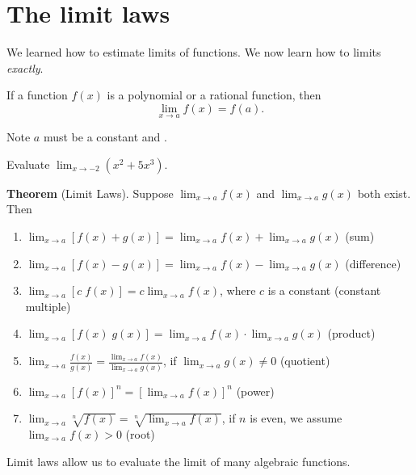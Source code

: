 \documentclass[../main.tex]{subfiles}
\begin{document}
 \section{The limit laws}
We learned how to estimate limits of functions. We now learn how to  limits \emph{exactly}.


\begin{mdframed}[style=simple-compact]
  If a function \(f(x)\) is a polynomial or a rational function, then
  \[
    \lim_{x \to a} f(x) = f(a).
  \]
\end{mdframed}
\faExclamationTriangle{} Note \(a\) must be a constant \underline{\hspace{6cm}} and \underline{\hspace{2in}}.


\begin{example}
  Evaluate \(\lim_{x \to -2} (x^{2} + 5 x^{3})\).

\end{example}

\begin{mdframed}[style=withref-compact]
  \textbf{Theorem} (Limit Laws). Suppose \(\lim_{x \to a} f(x)\) and \(\lim_{x \to a} g(x)\) {both exist}. Then
  \begin{enumerate}[label=(\arabic*)]
    \item \(\lim_{x \to a} [f(x) + g(x)] = \lim_{x \to a} f(x) + \lim_{x \to a} g(x)\) \hfill (sum)
    \item \(\lim_{x \to a} [f(x) - g(x)] = \lim_{x \to a} f(x) - \lim_{x \to a} g(x)\) \hfill (difference)
    \item \(\lim_{x \to a} [c \; f(x)] = c \lim_{x \to a} f(x)\), where \(c\) is a constant \hfill (constant multiple)
    \item \(\lim_{x \to a} [f(x) \; g(x)] = \lim_{x \to a} f(x) \cdot \lim_{x \to a} g(x)\) \hfill (product)
    \item \(\lim_{x \to a} \frac{f(x)}{g(x)} = \frac{\lim_{x \to a} f(x)}{\lim_{x \to a} g(x)}\), \quad if {\(\lim_{x \to a}g(x) \ne 0\)} \hfill (quotient)
    \item \(\lim_{x \to a} [f(x)]^{n} = \left[ \lim_{x \to a} f(x) \right]^{n}\) \hfill (power)
    \item \(\lim_{x \to a} \sqrt[n]{f(x)} = \sqrt[n]{\lim_{x \to a} f(x)}\), \quad if \(n\) is even, we assume {\(\lim_{x \to a} f(x) > 0\)} \hfill (root)
  \end{enumerate}
\end{mdframed}
\faLightbulb{} Limit laws allow us to evaluate the limit of many algebraic functions. 
\end{document}

